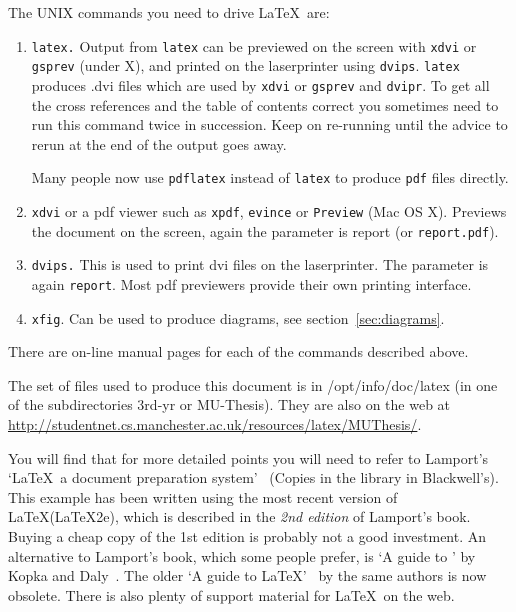 The UNIX commands you need to drive \LaTeX\ are:
\begin{enumerate}
\item \texttt{latex.} Output from \texttt{latex} can be previewed on
  the screen with \texttt{xdvi} or \texttt{gsprev} (under X), and printed on the laserprinter using  \texttt{dvips}.
  \texttt{latex} produces \textsf{.dvi} files which are used by
  \texttt{xdvi} or \texttt{gsprev} and \texttt{dvipr}.  To get all the
  cross references and the table of contents correct you sometimes
  need to run this command twice in succession.  Keep on re-running
  until the advice to rerun at the end of the output goes away.

  Many people now use \texttt{pdflatex} instead of \texttt{latex} to produce \texttt{pdf} files directly.
  
\item \texttt{xdvi} or a pdf viewer such as \texttt{xpdf}, \texttt{evince} or \texttt{Preview} (Mac OS X). Previews the document on the
  screen, again the parameter is \textsf{report} (or \texttt{report.pdf}).
  
\item \texttt{dvips.} This is used to print dvi files on the laserprinter.  The
  parameter is again \texttt{report}. Most pdf previewers provide their own printing interface.
  
\item \texttt{xfig}. Can be used to produce diagrams, see section~\ref{sec:diagrams}.

\end{enumerate}
There are on-line manual pages for each of the commands described above.

The set of files used to produce this document is in
\textsf{/opt/info/doc/latex} (in one of the subdirectories
\textsf{3rd-yr} or \textsf{MU-Thesis}).  They are also on the web at \url{http://studentnet.cs.manchester.ac.uk/resources/latex/MUThesis/}. 

You will find that for more detailed points you will need to refer to
Lamport's `\LaTeX\ a document preparation system'~\cite{lamport}
(Copies in the library  in Blackwell's).
This example has been written using the most recent version of \LaTeX(LaTeX2e), 
which is described in the \emph{2nd edition} of Lamport's
book. Buying a cheap copy of the 1st edition is probably not a good
investment. An alternative to Lamport's book, which some people
prefer, is `A guide to {\LaTeXe}' by Kopka and Daly~\cite{kopka}. The
older `A guide to {\LaTeX}'~\cite{kopka-old} by the same authors is
now obsolete. There is also plenty of support material for \LaTeX\ on the web.

